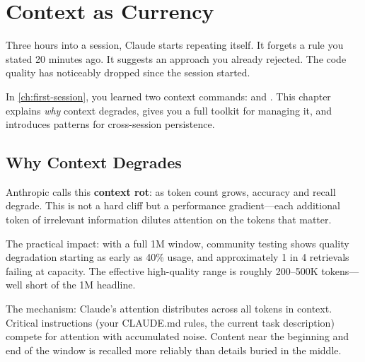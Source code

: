 \chapter{Context as Currency}
\label{ch:context}

\begin{itshape}
Three hours into a session, Claude starts repeating itself.
It forgets a rule you stated 20 minutes ago.
It suggests an approach you already rejected.
The code quality has noticeably dropped since the session started.
\end{itshape}

In \cref{ch:first-session}, you learned two context commands: 
and . This chapter explains \emph{why} context degrades,
gives you a full toolkit for managing it, and introduces patterns
for cross-session persistence.

\section{Why Context Degrades}
\label{sec:context-degradation}


\begin{whybox}
Anthropic calls this \textbf{context rot}: as token count grows,
accuracy and recall degrade. This is not a hard cliff but a
performance gradient---each additional token of irrelevant information
dilutes attention on the tokens that matter.

The practical impact: with a full 1M window, community testing shows
quality degradation starting as early as 40\% usage, and approximately
1 in 4 retrievals failing at capacity.
The effective high-quality range is roughly 200--500K tokens---well
short of the 1M headline.

The mechanism: Claude's attention distributes across all tokens
in context. Critical instructions (your CLAUDE.md rules, the current
task description) compete for attention with accumulated noise.
Content near the beginning and end of the window is recalled more
reliably than details buried in the middle.
\end{whybox}

